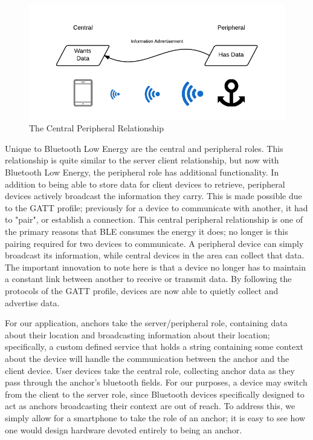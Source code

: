 \documentclass{sig-alternate}
\begin{document}
\begin{figure}[h!]
	\begin{center}
		\includegraphics[width=1.00\linewidth]{central_peripheral}
	\end{center}
	\vspace{-12pt}
	\caption{The Central Peripheral Relationship}
	\label{fig:Central Peripheral}
\end{figure}

Unique to Bluetooth Low Energy are the central and peripheral roles.
This relationship is quite similar to the server client relationship,
but now with Bluetooth Low Energy, the peripheral role has 
additional functionality. In addition to being able to store data 
for client devices to retrieve, peripheral devices actively broadcast
the information they carry. This is made possible due to the 
GATT profile; previously for a device to communicate with 
another, it had to "pair", or establish a connection. This 
central peripheral relationship is one of the primary reasons
that BLE consumes the energy it does; no longer is this 
pairing required for two devices to communicate. A
peripheral device can simply broadcast its information,
while central devices in the area can collect that data. The
important innovation to note here is that a device no longer
has to maintain a constant link between another to receive
or transmit data. By following the protocols of the GATT profile,
devices are now able to quietly collect and advertise data.

For our application, anchors take the server/peripheral role,
containing data about their location and broadcasting information
about their location; specifically, a custom defined service that
holds a string containing some context about the device will 
handle the communication between the anchor and the client
device. User devices take the central role, collecting anchor 
data as they pass through the anchor's bluetooth fields. 
For our purposes, a device may switch from the client to
the server role, since Bluetooth devices specifically designed
to act as anchors broadcasting their context are out of reach.
To address this, we simply allow for a smartphone to take
the role of an anchor; it is easy to see how one would design
hardware devoted entirely to being an anchor. 
\end{document}
